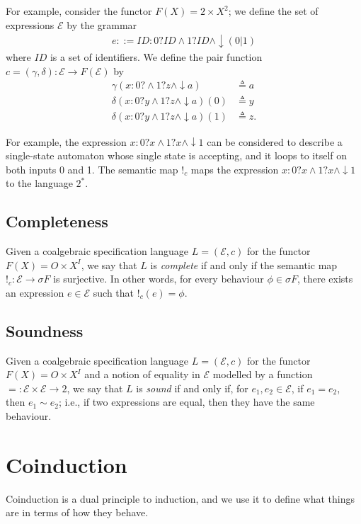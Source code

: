 For example, consider the functor $F(X)=2\times X^2$; we define the set of expressions $\mathcal{E}$ by the grammar
\begin{align}
    e::= ID:0?ID\land1?ID\land\downarrow (0|1)
\end{align}
where $ID$ is a set of identifiers. We define the pair function $c=(\gamma,\delta)\colon \mathcal{E}\rightarrow F(\mathcal{E})$ by 
\begin{align*}
    \gamma(x:0?\land1?z\land\downarrow a)&\triangleq a\\
    \delta(x:0?y\land1?z\land\downarrow a)(0)&\triangleq y\\
    \delta(x:0?y\land1?z\land\downarrow a)(1)&\triangleq z.
\end{align*}

For example, the expression $x:0?x\land1?x\land\downarrow 1$ can be considered to describe a single-state automaton whose single state is  accepting, and it loops to itself on both inputs 0 and 1. The semantic map $!_c$ maps the expression $x:0?x\land1?x\land\downarrow 1$ to the language $2^*$.%

\subsection{Completeness}
Given a coalgebraic specification language $L=(\mathcal{E},c)$ for the functor $F(X)=O\times X^I$, we say that $L$ is \emph{complete} if and only if the semantic map $!_c\colon \mathcal{E}\rightarrow \sigma F$ is surjective. In other words, for every behaviour $\phi\in \sigma F$, there exists an expression $e\in \mathcal{E}$ such that $!_c(e)=\phi$.

\subsection{Soundness}
Given a coalgebraic specification language $L=(\mathcal{E},c)$ for the functor $F(X)=O\times X^I$ and a notion of equality in $\mathcal{E}$ modelled by a function $=\colon \mathcal{E}\times \mathcal{E}\rightarrow 2$, we say that $L$ is \emph{sound} if and only if, for $e_1, e_2\in \mathcal{E}$, if $e_1=e_2$, then $e_1\sim e_2$; i.e., if two expressions are equal, then they have the same behaviour.

\section{Coinduction}
Coinduction is a dual principle to induction, and we use it to define what things are in terms of how they behave. 

